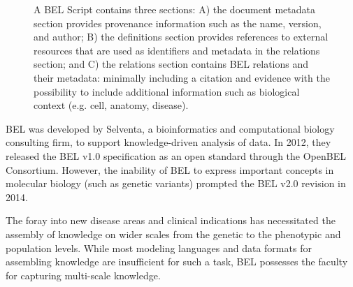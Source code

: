 \begin{figure}
\captionsetup{format=plain}
\caption[The Schema of a BEL Script]{A BEL Script contains three sections: A) the document metadata section provides provenance information such as the name, version, and author; B) the definitions section provides references to external resources that are used as identifiers and metadata in the relations section; and C) the relations section contains BEL relations and their metadata: minimally including a citation and evidence with the possibility to include additional information such as biological context (e.g. cell, anatomy, disease).}
\label{Fig:bel_script}
\end{figure}

BEL was developed by Selventa, a bioinformatics and computational biology consulting firm, to support knowledge-driven analysis of data. In 2012, they released the \ac{BEL} v1.0 specification as an open standard through the OpenBEL Consortium. However, the inability of BEL to express important concepts in molecular biology (such as genetic variants) prompted the \ac{BEL} v2.0 revision in 2014.

The foray into new disease areas and clinical indications has necessitated the assembly of knowledge on wider scales from the genetic to the phenotypic and population levels. While most modeling languages and data formats for assembling knowledge are insufficient for such a task, BEL possesses the faculty for capturing multi-scale knowledge. 


